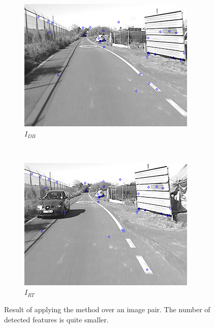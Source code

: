 \begin{figure}[h!]
        \centering
        \begin{subfigure}[b]{0.45\textwidth}
                \centering
                \includegraphics[width=\textwidth]{featuresSIFT1}
                \caption{$I_{DB}$}\label{fig:cp01_features_sift_1}
        \end{subfigure}%
        ~ %
        \begin{subfigure}[b]{0.45\textwidth}
                \centering
                \includegraphics[width=\textwidth]{featuresSIFT2}
                \caption{$I_{RT}$}\label{fig:cp01_features_sift_2}
        \end{subfigure}%
        \caption{Result of applying the \cite{lowe1999object} method over an image pair. The number of detected features is quite smaller.}\label{fig:cp01_sift_features}
\end{figure}

